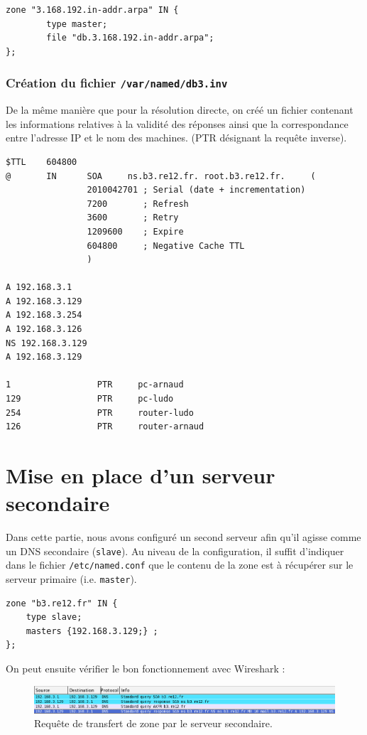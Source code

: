 \documentclass[12pt,a4paper,notitlepage]{article}
\begin{document}
\begin{lstlisting}[title=Ajout de la zone inverse à gérer]
zone "3.168.192.in-addr.arpa" IN {
        type master;
        file "db.3.168.192.in-addr.arpa";
};
\end{lstlisting}

\subsubsection{Création du fichier \texttt{/var/named/db3.inv}}
De la même manière que pour la résolution directe, on créé un fichier contenant les informations relatives à la validité des réponses ainsi que la correspondance entre l'adresse IP et le nom des machines. (PTR désignant la requête inverse).
\begin{lstlisting}[title=Paramètres de la zone inverse]
$TTL    604800
@       IN      SOA     ns.b3.re12.fr. root.b3.re12.fr.     (
                2010042701 ; Serial (date + incrementation)
                7200       ; Refresh
                3600       ; Retry
                1209600    ; Expire
                604800     ; Negative Cache TTL
                )

A 192.168.3.1
A 192.168.3.129
A 192.168.3.254
A 192.168.3.126
NS 192.168.3.129
A 192.168.3.129

1                 PTR     pc-arnaud
129               PTR     pc-ludo
254               PTR     router-ludo
126               PTR     router-arnaud
\end{lstlisting}


\clearpage
\section{Mise en place d'un serveur secondaire}

Dans cette partie, nous avons configuré un second serveur afin qu'il agisse comme un DNS secondaire (\texttt{slave}). Au niveau de la configuration, il suffit d'indiquer dans le fichier \texttt{/etc/named.conf} que le contenu de la zone est à récupérer sur le serveur primaire (i.e. \texttt{master}).\\


\begin{lstlisting}[title=Configuration du serveur secondaire]
zone "b3.re12.fr" IN {
	type slave;
	masters {192.168.3.129;} ;
};
\end{lstlisting}\bigskip
On peut ensuite vérifier le bon fonctionnement avec Wireshark :

\begin{figure}[!h]
\begin{center}
\includegraphics[scale=0.43]{dns-secondaire}
\caption{Requête de transfert de zone par le serveur secondaire.}
\label{fig:da}
\end{center}
\end{figure}
\end{document}
